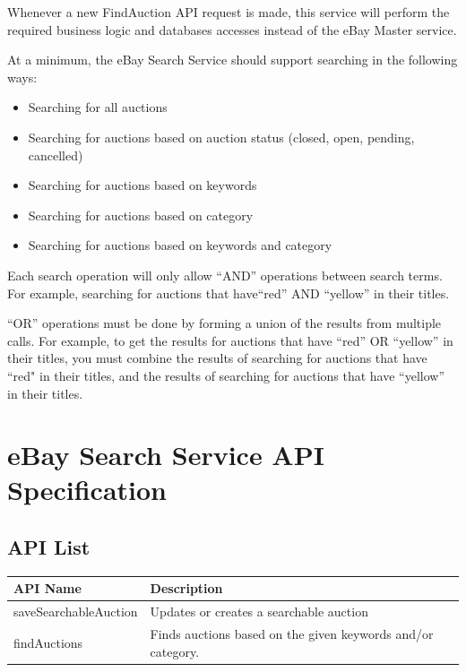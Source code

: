 \documentclass[12pt,a4paper]{article}
\begin{document}
Whenever a new FindAuction API request is made, 
this service will perform the required business logic and databases accesses 
instead of the eBay Master service.

\vspace{\baselineskip}


At a minimum, the eBay Search Service should support searching in the following ways:

\begin{itemize}
    \item Searching for all auctions
    \item Searching for auctions based on auction status (closed, open, pending, cancelled)
    \item Searching for auctions based on keywords
    \item Searching for auctions based on category
    \item Searching for auctions based on keywords and category
\end{itemize}

Each search operation will only allow ``AND'' operations between search terms. 
For example, searching for auctions that have``red'' AND ``yellow'' in their titles.
\vspace{\baselineskip}

``OR'' operations must be done by forming a union of the results from multiple calls. 
For example, to get the results for auctions that have ``red'' OR ``yellow'' in their titles, 
you must combine the results of searching for auctions that have ``red" in their titles,
and the results of searching for auctions that have ``yellow'' in their titles.


\pagebreak

 
\section{eBay Search Service API Specification}

\subsection{API List}
\begin{center}
    \begin{tabular}{| l | l |}
        \hline
        \textbf{API Name} & \textbf{Description} \\
        \hline
            saveSearchableAuction & Updates or creates a searchable auction \\ 
        \hline
            findAuctions & Finds auctions based on the given keywords and/or category. \\
        \hline
    \end{tabular}
\end{center}
\end{document}
